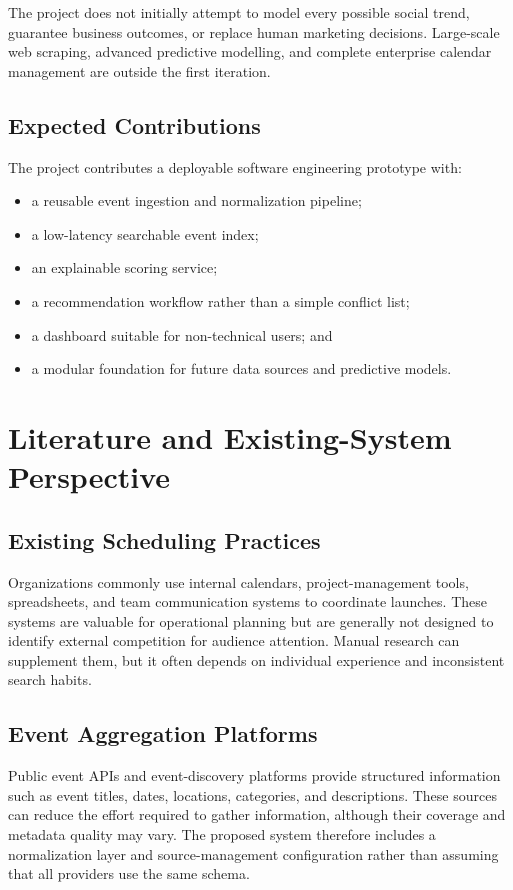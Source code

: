 \documentclass[12pt]{article}
\begin{document}
The project does not initially attempt to model every possible social trend, guarantee business outcomes, or replace human marketing decisions. Large-scale web scraping, advanced predictive modelling, and complete enterprise calendar management are outside the first iteration.

\subsection{Expected Contributions}
The project contributes a deployable software engineering prototype with:
\begin{itemize}[leftmargin=0.7cm]
\item a reusable event ingestion and normalization pipeline;
\item a low-latency searchable event index;
\item an explainable scoring service;
\item a recommendation workflow rather than a simple conflict list;
\item a dashboard suitable for non-technical users; and
\item a modular foundation for future data sources and predictive models.
\end{itemize}

\section{Literature and Existing-System Perspective}

\subsection{Existing Scheduling Practices}
Organizations commonly use internal calendars, project-management tools, spreadsheets, and team communication systems to coordinate launches. These systems are valuable for operational planning but are generally not designed to identify external competition for audience attention. Manual research can supplement them, but it often depends on individual experience and inconsistent search habits.

\subsection{Event Aggregation Platforms}
Public event APIs and event-discovery platforms provide structured information such as event titles, dates, locations, categories, and descriptions. These sources can reduce the effort required to gather information, although their coverage and metadata quality may vary. The proposed system therefore includes a normalization layer and source-management configuration rather than assuming that all providers use the same schema.
\end{document}
